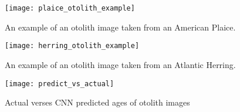 \begin{figure}
    \texttt{[image: plaice\_otolith\_example]}
    \caption{An example of an otolith image taken from an American Plaice.}
    \label{fig:plaice_oto_example}
\end{figure}

\begin{figure}
    \texttt{[image: herring\_otolith\_example]}
    \caption{An example of an otolith image taken from an Atlantic Herring.}
    \label{fig:herring_oto_example}
\end{figure}


\begin{figure}
    \texttt{[image: predict\_vs\_actual]}
    \caption{Actual verses CNN predicted ages of otolith images}
    \label{fig:actual_vs_predicted}
\end{figure}